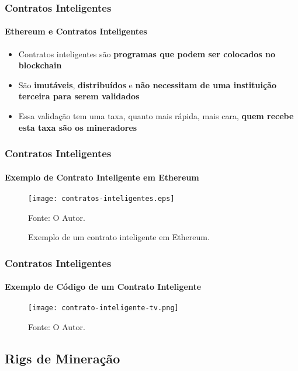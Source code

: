 \documentclass[aspectratio=43]{beamer}
\begin{document}
\begin{frame}
    \frametitle{Contratos Inteligentes}
    \framesubtitle{Ethereum e Contratos Inteligentes}
    
    \begin{itemize}
        \item Contratos inteligentes são \textbf{programas que podem ser
            colocados no blockchain}

        \item São \textbf{imutáveis}, \textbf{distribuídos} e
            \textbf{não necessitam de uma instituição terceira para
            serem validados}

        \item Essa validação tem uma taxa, quanto mais rápida, mais
            cara, \textbf{quem recebe esta taxa são os mineradores}
    
    \end{itemize}
\end{frame}

\begin{frame}
    \frametitle{Contratos Inteligentes}
    \framesubtitle{Exemplo de Contrato Inteligente em Ethereum}
\begin{figure}[H]
    \caption{\label{fig:contratos-inteligentes}Exemplo de um contrato
    inteligente em Ethereum.}
    \begin{center}
        \texttt{[image: contratos-inteligentes.eps]}
    \end{center}
    Fonte: O Autor.
\end{figure}

\end{frame}

\begin{frame}
    \frametitle{Contratos Inteligentes}
    \framesubtitle{Exemplo de Código de um Contrato Inteligente}
\begin{figure}[H]
    \begin{center}
        \texttt{[image: contrato-inteligente-tv.png]}
    \end{center}
    Fonte: O Autor.
\end{figure}

\end{frame}

\subsection{Rigs de Mineração}
\end{document}
